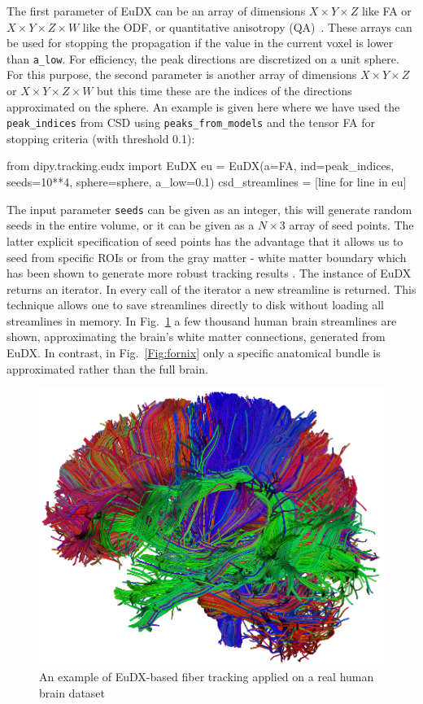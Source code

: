 \documentclass{bioinfo}
\begin{document}
The first parameter of EuDX can be an array of dimensions $X\times Y\times Z$
like FA or $X\times Y\times Z \times W$ like the ODF, or quantitative
anisotropy (QA)~\citep{yeh-etal:10}. These arrays can be used for stopping the
propagation if the value in the current voxel is lower than
\texttt{a\_low}. For efficiency, the peak directions are discretized on a unit
sphere. For this purpose, the second parameter is another array of dimensions
$X\times Y\times Z$ or $X\times Y\times Z\times W$ but this time these are the
indices of the directions approximated on the sphere. An example is given here
where we have used the \texttt{peak\_indices} from CSD using \texttt{peaks\_from\_models}
and the tensor FA for stopping criteria (with threshold 0.1):
\begin{python}
from dipy.tracking.eudx import EuDX
eu = EuDX(a=FA, ind=peak_indices, seeds=10**4,
          sphere=sphere, a_low=0.1)
csd_streamlines = [line for line in eu]
\end{python}
The input parameter \texttt{seeds} can be given as an integer, this will
generate random seeds in the entire volume, or it can be given as a $N\times 3$
array of seed points. The latter explicit specification of seed points has the
advantage that it allows us to seed from specific ROIs or from the gray matter
- white matter boundary which has been shown to generate more robust tracking
results \citep{Cote2013tractometer}. The instance of EuDX returns an
iterator. In every call of the iterator a new streamline is returned. This
technique allows one to save streamlines directly to disk without loading all
streamlines in memory. In Fig.~\ref{Fig:pretty_streamlines} a few thousand
human brain streamlines are shown, approximating the brain's white matter connections, 
generated from EuDX. In contrast, in Fig.~\ref{Fig:fornix} only a specific anatomical bundle is
approximated rather than the full brain.

\begin{figure}
\includegraphics[scale=0.75]{Figures/pretty_streamlines.eps}
\centering{}
\caption{An example of EuDX-based fiber tracking applied on a real
  human brain dataset\label{Fig:pretty_streamlines}}
\end{figure}
\end{document}
